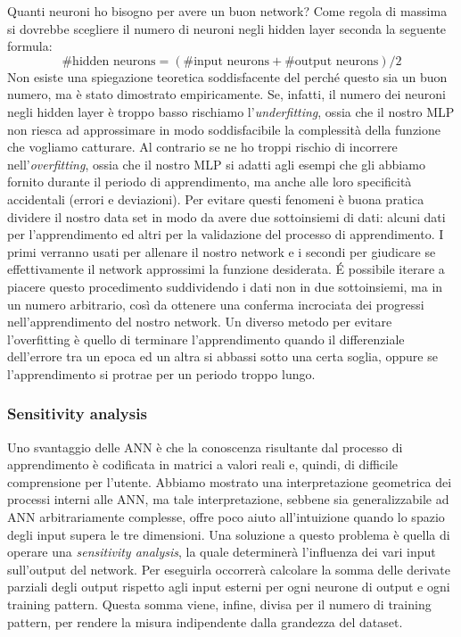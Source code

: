 \documentclass[10pt,a4paper]{article}
\begin{document}
Quanti neuroni ho bisogno per avere un buon network? Come regola di massima si dovrebbe scegliere il numero di neuroni negli hidden layer seconda la seguente formula:
$$
\# \text{hidden neurons} = (\# \text{input neurons} + \# \text{output neurons})/2
$$
Non esiste una spiegazione teoretica soddisfacente del perché questo sia un buon numero, ma è stato dimostrato empiricamente. Se, infatti, il numero dei neuroni negli hidden layer è troppo basso rischiamo l'\emph{underfitting}, ossia che il nostro MLP non riesca ad approssimare in modo soddisfacibile la complessità della funzione che vogliamo catturare. Al contrario se ne ho troppi rischio di incorrere nell'\emph{overfitting}, ossia che il nostro MLP si adatti agli esempi che gli abbiamo fornito durante il periodo di apprendimento, ma anche alle loro specificità accidentali (errori e deviazioni).
Per evitare questi fenomeni è buona pratica dividere il nostro data set in modo da avere due sottoinsiemi di dati: alcuni dati per l'apprendimento ed altri per la validazione del processo di apprendimento. I primi verranno usati per allenare il nostro network e i secondi per giudicare se effettivamente il network approssimi la funzione desiderata. \'E possibile iterare a piacere questo procedimento suddividendo i dati non in due sottoinsiemi, ma in un numero arbitrario, così da ottenere una conferma incrociata dei progressi nell'apprendimento del nostro network.
Un diverso metodo per evitare l'overfitting è quello di terminare l'apprendimento quando il differenziale dell'errore tra un epoca ed un altra si abbassi sotto una certa soglia, oppure se l'apprendimento si protrae per un periodo troppo lungo.

\subsubsection{Sensitivity analysis}

Uno svantaggio delle ANN è che la conoscenza risultante dal processo di apprendimento è codificata in matrici a valori reali e, quindi, di difficile comprensione per l'utente. Abbiamo mostrato una interpretazione geometrica dei processi interni alle ANN, ma tale interpretazione, sebbene sia generalizzabile ad ANN arbitrariamente complesse, offre poco aiuto all'intuizione quando lo spazio degli input supera le tre dimensioni. Una soluzione a questo problema è quella di operare una \emph{sensitivity analysis}, la quale determinerà l'influenza dei vari input sull'output del network. Per eseguirla occorrerà calcolare la somma delle derivate parziali degli output rispetto agli input esterni per ogni neurone di output e ogni training pattern. Questa somma viene, infine, divisa per il numero di training pattern, per rendere la misura indipendente dalla grandezza del dataset.
\end{document}
